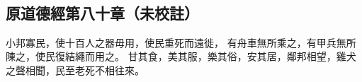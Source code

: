 ﻿%
%

\chapter{~}

\section{原道德經第八十章（未校註）}

\begin{withgezhu}

\zhsong


小邦寡民，\textcolor{tongjia-color}{使十百人之器毋用，使民重死而遠徙}，
有舟車無所乘之，有甲兵無所陳之，使民復結繩而用之。
甘其食，美其服，樂其俗，安其居，鄰邦相望，雞犬之聲相聞，民至老死不相往來。

\end{withgezhu}
